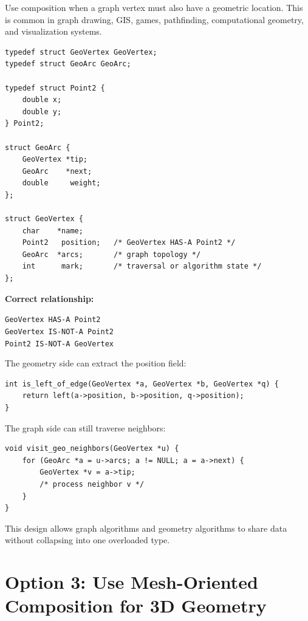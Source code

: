 \documentclass[11pt]{article}
\begin{document}
Use composition when a graph vertex must also have a geometric location. This is common in graph drawing, GIS, games, pathfinding, computational geometry, and visualization systems.

\begin{verbatim}
typedef struct GeoVertex GeoVertex;
typedef struct GeoArc GeoArc;

typedef struct Point2 {
    double x;
    double y;
} Point2;

struct GeoArc {
    GeoVertex *tip;
    GeoArc    *next;
    double     weight;
};

struct GeoVertex {
    char    *name;
    Point2   position;   /* GeoVertex HAS-A Point2 */
    GeoArc  *arcs;       /* graph topology */
    int      mark;       /* traversal or algorithm state */
};
\end{verbatim}

\begin{decisionbox}
\textbf{Correct relationship:}
\begin{center}
\texttt{GeoVertex HAS-A Point2} \\[-1pt]
\texttt{GeoVertex IS-NOT-A Point2} \\[-1pt]
\texttt{Point2 IS-NOT-A GeoVertex}
\end{center}
\end{decisionbox}

The geometry side can extract the position field:

\begin{verbatim}
int is_left_of_edge(GeoVertex *a, GeoVertex *b, GeoVertex *q) {
    return left(a->position, b->position, q->position);
}
\end{verbatim}

The graph side can still traverse neighbors:

\begin{verbatim}
void visit_geo_neighbors(GeoVertex *u) {
    for (GeoArc *a = u->arcs; a != NULL; a = a->next) {
        GeoVertex *v = a->tip;
        /* process neighbor v */
    }
}
\end{verbatim}

This design allows graph algorithms and geometry algorithms to share data without collapsing into one overloaded type.

\section{Option 3: Use Mesh-Oriented Composition for 3D Geometry}
\end{document}
